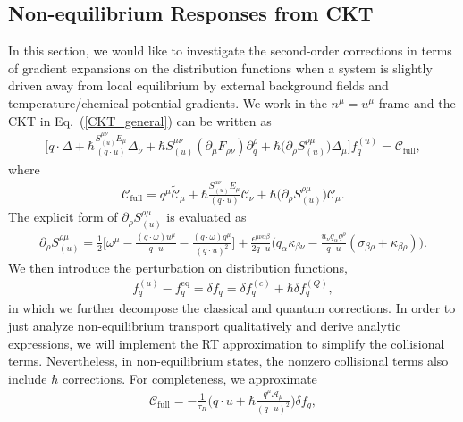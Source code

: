 \documentclass[aps,prd,showkeys,preprint,amsmath,amssymb,nofootinbib]{revtex4-1}
\begin{document}
\subsection{ Non-equilibrium Responses from CKT}\label{Non_equ_Responses}
In this section, we would like to investigate the second-order corrections in terms of gradient expansions on the distribution functions when a system is slightly driven away from local equilibrium by external background fields and temperature/chemical-potential gradients. We work in the $n^{\mu}=u^{\mu}$ frame and the CKT in Eq.~(\ref{CKT_general}) can be written as
\begin{eqnarray}
\Bigg[
q\cdot\Delta+\hbar\frac{S_{(u)}^{\mu\nu}E_{\mu}}{(q\cdot u)}\Delta_{\nu}
+\hbar S_{(u)}^{\mu\nu}(\partial_{\mu}F_{\rho \nu})\partial^{\rho}_{q}+\hbar\big(\partial_{\rho}S^{\rho\mu}_{(u)}\big)\Delta_{\mu}\Bigg]f^{(u)}_q
=\mathcal{C}_\text{full},
\end{eqnarray}
where
\begin{eqnarray}
\mathcal{C}_\text{full}=q^{\mu}\tilde{\mathcal{C}}_{\mu}+\hbar\frac{S_{(u)}^{\mu\nu}E_{\mu}}{(q\cdot u)}\mathcal{C}_{\nu}+\hbar\big(\partial_{\rho}S^{\rho\mu}_{(u)}\big)\mathcal{C}_{\mu}.
\end{eqnarray}
The explicit form of $\partial_{\rho}S^{\rho\mu}_{(u)}$ is evaluated as
\begin{eqnarray}
\partial_{\rho}S^{\rho\mu}_{(u)}=\frac{1}{2}\Bigg[\omega^{\mu}-\frac{(q\cdot\omega)u^{\mu}}{q\cdot u}
-\frac{(q\cdot\omega)q^{\mu}}{(q\cdot u)^2}\Bigg]+
\frac{\epsilon^{\mu\nu\alpha\beta}}{2q\cdot u}\Bigg(q_{\alpha}\kappa_{\beta\nu}
-\frac{u_{\nu}q_{\alpha}q^{\rho}}{q\cdot u}(\sigma_{\beta\rho}+\kappa_{\beta\rho})\Bigg).
\end{eqnarray}
We then introduce the perturbation on distribution functions, 
\begin{eqnarray}\label{f_ansatz}
f^{(u)}_q-f^\text{eq}_q=\delta f_q=\delta f^{(c)}_{q}+\hbar\delta f^{(Q)}_{q},
\end{eqnarray}
in which we further decompose the classical and quantum corrections. 
In order to just analyze non-equilibrium transport qualitatively and derive analytic expressions, we will implement the RT approximation to simplify the collisional terms. Nevertheless, in non-equilibrium states, the nonzero collisional terms also include $\hbar$ corrections. For completeness, we approximate
\begin{eqnarray}\label{RT_approx}
\mathcal{C}_\text{full}=-\frac{1}{\tau_R}\Big(q\cdot u+\hbar \frac{q^{\mu}\mathcal{A}_{\mu}}{(q\cdot u)^2}\Big)\delta f_q,
\end{eqnarray}
\end{document}
